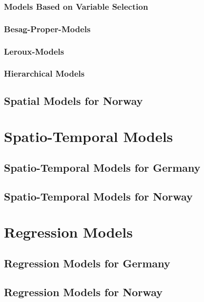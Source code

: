 \subsubsection{Models Based on Variable Selection} 
\subsubsection{Besag-Proper-Models}
\subsubsection{Leroux-Models}
\subsubsection{Hierarchical Models}
\subsection{Spatial Models for Norway}
\clearpage
\section{Spatio-Temporal Models}
\subsection{Spatio-Temporal Models for Germany}
\subsection{Spatio-Temporal Models for Norway}
\section{Regression Models}
\clearpage
\subsection{Regression Models for Germany}
\subsection{Regression Models for Norway}